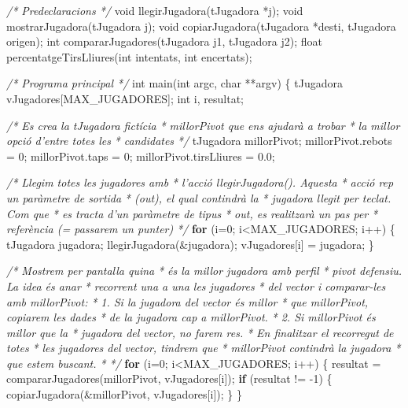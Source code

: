 \documentclass[]{book}
\newenvironment{Shaded}{\begin{snugshade}}{\end{snugshade}}
\newcommand{\DataTypeTok}[1]{\textcolor[rgb]{0.13,0.29,0.53}{#1}}
\newcommand{\DecValTok}[1]{\textcolor[rgb]{0.00,0.00,0.81}{#1}}
\newcommand{\FloatTok}[1]{\textcolor[rgb]{0.00,0.00,0.81}{#1}}
\newcommand{\CommentTok}[1]{\textcolor[rgb]{0.56,0.35,0.01}{\textit{#1}}}
\newcommand{\ControlFlowTok}[1]{\textcolor[rgb]{0.13,0.29,0.53}{\textbf{#1}}}
\newcommand{\NormalTok}[1]{#1}
\begin{document}
\begin{Shaded}
\begin{Highlighting}[]
\CommentTok{/* Predeclaracions */}
\DataTypeTok{void}\NormalTok{ llegirJugadora(tJugadora *j);}
\DataTypeTok{void}\NormalTok{ mostrarJugadora(tJugadora j);}
\DataTypeTok{void}\NormalTok{ copiarJugadora(tJugadora *desti, tJugadora origen);}
\DataTypeTok{int}\NormalTok{ compararJugadores(tJugadora j1, tJugadora j2);}
\DataTypeTok{float}\NormalTok{ percentatgeTirsLliures(}\DataTypeTok{int}\NormalTok{ intentats, }\DataTypeTok{int}\NormalTok{ encertats);}

\CommentTok{/* Programa principal */}
\DataTypeTok{int}\NormalTok{ main(}\DataTypeTok{int}\NormalTok{ argc, }\DataTypeTok{char}\NormalTok{ **argv) \{}
\NormalTok{    tJugadora vJugadores[MAX_JUGADORES];}
    \DataTypeTok{int}\NormalTok{ i, resultat;}

    \CommentTok{/* Es crea la tJugadora fictícia }
\CommentTok{     * millorPivot que ens ajudarà a trobar }
\CommentTok{     * la millor opció d'entre totes les }
\CommentTok{     * candidates}
\CommentTok{     */}
\NormalTok{    tJugadora millorPivot;    }
\NormalTok{    millorPivot.rebots = }\DecValTok{0}\NormalTok{;}
\NormalTok{    millorPivot.taps = }\DecValTok{0}\NormalTok{;}
\NormalTok{    millorPivot.tirsLliures = }\FloatTok{0.0}\NormalTok{;}

    \CommentTok{/* Llegim totes les jugadores amb }
\CommentTok{     * l'acció llegirJugadora(). Aquesta}
\CommentTok{     * acció rep un paràmetre de sortida}
\CommentTok{     * (out), el qual contindrà la }
\CommentTok{     * jugadora llegit per teclat. Com que}
\CommentTok{     * es tracta d'un paràmetre de tipus }
\CommentTok{     * out, es realitzarà un pas per }
\CommentTok{     * referència (= passarem un punter)}
\CommentTok{     */}
    \ControlFlowTok{for}\NormalTok{ (i=}\DecValTok{0}\NormalTok{; i<MAX_JUGADORES; i++) \{}
\NormalTok{        tJugadora jugadora;}
\NormalTok{        llegirJugadora(&jugadora);}
\NormalTok{        vJugadores[i] = jugadora;}
\NormalTok{    \}}
    
    \CommentTok{/* Mostrem per pantalla quina}
\CommentTok{     * és la millor jugadora amb perfil}
\CommentTok{     * pivot defensiu. La idea és anar}
\CommentTok{     * recorrent una a una les jugadores}
\CommentTok{     * del vector i comparar-les amb millorPivot:}
\CommentTok{     * 1. Si la jugadora del vector és millor}
\CommentTok{     *    que millorPivot, copiarem les dades}
\CommentTok{     *    de la jugadora cap a millorPivot.}
\CommentTok{     * 2. Si millorPivot és millor que la}
\CommentTok{     *    jugadora del vector, no farem res.}
\CommentTok{     * En finalitzar el recorregut de totes}
\CommentTok{     * les jugadores del vector, tindrem que}
\CommentTok{     * millorPivot contindrà la jugadora}
\CommentTok{     * que estem buscant.}
\CommentTok{     * */}
    \ControlFlowTok{for}\NormalTok{ (i=}\DecValTok{0}\NormalTok{; i<MAX_JUGADORES; i++) \{}
\NormalTok{        resultat = compararJugadores(millorPivot, vJugadores[i]);}
        \ControlFlowTok{if}\NormalTok{ (resultat != -}\DecValTok{1}\NormalTok{) \{}
\NormalTok{            copiarJugadora(&millorPivot, vJugadores[i]);}
\NormalTok{        \}}
\NormalTok{    \}}
    

\end{Highlighting}
\end{Shaded}
\end{document}
